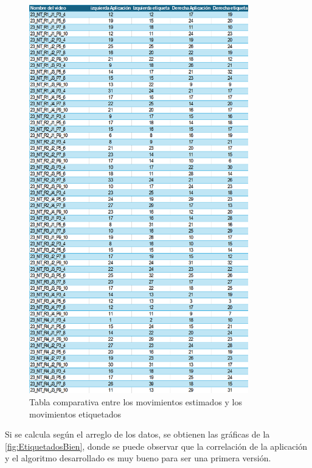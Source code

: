 \begin{figure}[H]
    \centering
    \includegraphics[width=0.85\textwidth]{images/7/ValidacionMovimientos.png}
    \caption{Tabla comparativa entre los movimientos estimados y los movimientos etiquetados}
    \label{fig:TablaResultados}
\end{figure}
\clearpage
Si se calcula según el arreglo de los datos, se obtienen las gráficas de la \autoref{fig:EtiquetadosBien}, donde se puede observar que la correlación de la aplicación y el algoritmo desarrollado es muy bueno para ser una primera versión.

